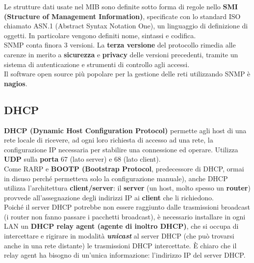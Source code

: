         Le strutture dati usate nel MIB sono definite sotto forma di regole nello \textbf{SMI (Structure of
        Management Information)}, specificate con lo standard ISO chiamato ASN.1 (Abstract Syntax
        Notation One), un linguaggio di definizione di oggetti. In particolare vengono definiti nome,
        sintassi e codifica.\\

        SNMP conta finora 3 versioni. La \textbf{terza versione} del protocollo rimedia alle carenze in merito
        a \textbf{sicurezza} e \textbf{privacy} delle versioni precedenti, tramite un sistema di autenticazione e
        strumenti di controllo agli accessi.\\

        Il software open source più popolare per la gestione delle reti utilizzando SNMP è \textbf{nagios}.
        
    \subsection{DHCP}

        \textbf{DHCP (Dynamic Host Configuration Protocol)} permette agli host di una rete locale di
        ricevere, ad ogni loro richiesta di accesso ad una rete, la configurazione IP necessaria per
        stabilire una connessione ed operare. Utilizza \textbf{UDP} sulla \textbf{porta} 67 (lato server) e 68 (lato client).\\

        Come RARP e \textbf{BOOTP (Bootstrap Protocol}, predecessore di DHCP, ormai in disuso perché
        permetteva solo la configurazione manuale), anche DHCP utilizza l’architettura \textbf{client/server}:
        il \textbf{server} (un host, molto spesso un \textbf{router}) provvede all’assegnazione degli indirizzi IP ai \textbf{client}
        che li richiedono.\\

        Poiché il server DHCP potrebbe non essere raggiunto dalle trasmissioni broadcast (i router non
        fanno passare i pacchetti broadcast), è necessario installare in ogni LAN un \textbf{DHCP relay agent
        (agente di inoltro DHCP)}, che si occupa di intercettare e rigirare in modalità \textbf{\emph{unicast}} al server
        DHCP (che può trovarsi anche in una rete distante) le trasmissioni DHCP intercettate. È chiaro
        che il relay agent ha bisogno di un’unica informazione: l’indirizzo IP del server DHCP.\\

